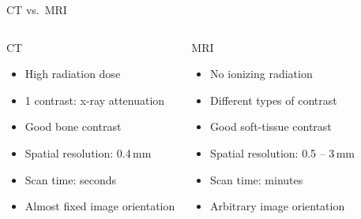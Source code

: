 \begin{frame}[c]{CT vs.~MRI}

    \begin{columns}[c,onlytextwidth]
        \centering{}
        \begin{block}{CT}
            \begin{itemize}
                \small
                \item High radiation dose
                \item 1 contrast: x-ray attenuation
                \item Good bone contrast
                \item Spatial resolution: 0.4\,mm
                \item Scan time: seconds
                \item Almost fixed image orientation
            \end{itemize}
        \end{block}%
        \begin{block}{MRI}
            \centering{}
            \begin{itemize}
                \small
                \item No ionizing radiation
                \item Different types of contrast
                \item Good soft-tissue contrast
                \item Spatial resolution: 0.5 -- 3\,mm
                \item Scan time: minutes
                \item Arbitrary image orientation
            \end{itemize}
        \end{block}

    \end{columns}

\end{frame}

